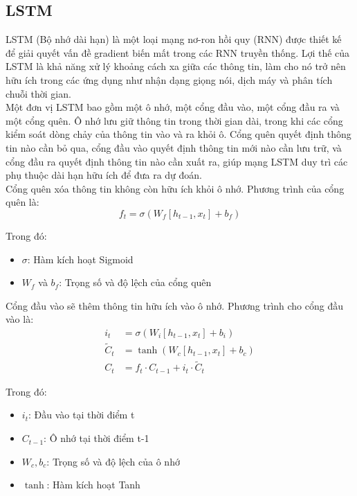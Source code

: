 \documentclass[conference]{IEEEtran}
\begin{document}
\subsection{LSTM}
LSTM (Bộ nhớ dài hạn) là một loại mạng nơ-ron hồi quy (RNN) được thiết kế để giải quyết vấn đề gradient biến mất trong các RNN truyền thống. Lợi thế của LSTM là khả năng xử lý khoảng cách xa giữa các thông tin, làm cho nó trở nên hữu ích trong các ứng dụng như nhận dạng giọng nói, dịch máy và phân tích chuỗi thời gian.
\\
Một đơn vị LSTM bao gồm một ô nhớ, một cổng đầu vào, một cổng đầu ra và một cổng quên. Ô nhớ lưu giữ thông tin trong thời gian dài, trong khi các cổng kiểm soát dòng chảy của thông tin vào và ra khỏi ô. Cổng quên quyết định thông tin nào cần bỏ qua, cổng đầu vào quyết định thông tin mới nào cần lưu trữ, và cổng đầu ra quyết định thông tin nào cần xuất ra, giúp mạng LSTM duy trì các phụ thuộc dài hạn hữu ích để đưa ra dự đoán.
\\
Cổng quên xóa thông tin không còn hữu ích khỏi ô nhớ. Phương trình của cổng quên là:\\
\begin{equation*}
    f_t = \sigma(W_f [h_{t-1}, x_t] + b_f)
\end{equation*}

Trong đó:
\begin{itemize}
    \item $\sigma$: Hàm kích hoạt Sigmoid
    \item $W_f$ và $b_f$: Trọng số và độ lệch của cổng quên
\end{itemize}

Cổng đầu vào sẽ thêm thông tin hữu ích vào ô nhớ. Phương trình cho cổng đầu vào là:
\\
\begin{align*}
    i_t &= \sigma(W_i [h_{t-1}, x_t] + b_i) \\
    \tilde{C}_t &= \tanh(W_c [h_{t-1}, x_t] + b_c) \\
    C_t &= f_t \cdot C_{t-1} + i_t \cdot \tilde{C}_t
\end{align*}

Trong đó:
\begin{itemize}
    \item $i_t$: Đầu vào tại thời điểm t
    \item $C_{t-1}$: Ô nhớ tại thời điểm t-1
    \item $W_c, b_c$: Trọng số và độ lệch của ô nhớ
    \item $\tanh$: Hàm kích hoạt Tanh
\end{itemize}
\end{document}
